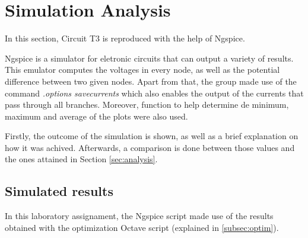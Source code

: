 
\section{Simulation Analysis}
\label{sec:simulation}



In this section, Circuit T3 is reproduced with the help of Ngspice.

Ngspice is a simulator for eletronic circuits that can output a variety of results.
This emulator computes the voltages in every node, as well as the potential difference
between two given nodes. Apart from that, the group made use of the command
{\em .options savecurrents} which also enables the output of the currents that pass
through all branches. Moreover, function to help determine de minimum, maximum and average
of the plots were also used.


Firstly, the outcome of the simulation is shown, as well as a brief explanation
on how it was achived. Afterwards, a comparison is done between those values and
the ones attained in Section \ref{sec:analysis}.




\subsection{Simulated results}
\label{subsec:sim_res}




In this laboratory assignament, the Ngspice script made use of the results obtained
with the optimization Octave script (explained in \ref{subsec:optim}).

